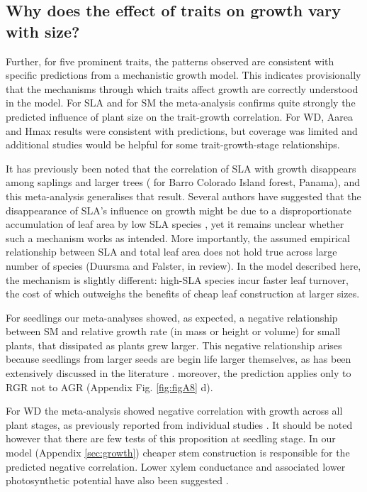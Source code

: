 \documentclass[a4paper]{article}\usepackage[]{graphicx}\usepackage[]{color}
\begin{document}
\subsection*{Why does the effect of traits on growth vary with size?}

Further, for five prominent traits, the patterns observed are consistent with specific predictions from a mechanistic growth model. This indicates provisionally that the mechanisms through which traits affect growth are correctly understood in the model. For SLA and for SM the meta-analysis confirms quite strongly the predicted influence of plant size on the trait-growth correlation. For WD, Aarea and Hmax results were consistent with predictions, but coverage was limited and additional studies would be helpful for some trait-growth-stage relationships.

It has previously been noted that the correlation of SLA with growth disappears among saplings and larger trees (\citealt{Wright:2010tp} for Barro Colorado Island forest, Panama), and this meta-analysis generalises that result. Several authors have suggested that the disappearance of SLA's influence on growth might be due to a disproportionate accumulation of leaf area by low SLA species \citep{Reich:1992wm,Poorter:2008iu,Wright:2010tp}, yet it remains unclear whether such a mechanism works as intended. More importantly, the assumed empirical relationship between SLA and total leaf area does not hold true across large number of species (Duursma and Falster, in review). In the model described here, the mechanism is slightly different: high-SLA species incur faster leaf turnover, the cost of which outweighs the benefits of cheap leaf construction at larger sizes.

For seedlings our meta-analyses showed, as expected, a negative relationship between SM and relative growth rate (in mass or height or volume) for small plants, that dissipated as plants grew larger. This negative relationship arises because seedlings from larger seeds are begin life larger themselves, as has been extensively discussed in the literature \citep[reviewed by][]{Turnbull:2012ew}. moreover, the prediction applies only to RGR not to AGR (Appendix Fig. \ref{fig:figA8} d).

For WD the meta-analysis showed negative correlation with growth across all plant stages, as previously reported from individual studies \citep{Wright:2010tp,Ruger:2012jv}. It should be noted however that there are few tests of this proposition at seedling stage. In our model (Appendix \ref{sec:growth}) cheaper stem construction is responsible for the predicted negative correlation. Lower xylem conductance and associated lower photosynthetic potential have also been suggested \citep[reviewed by][]{Chave:2009iy}.
\end{document}
